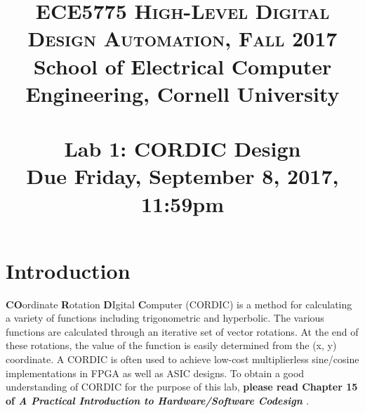 \documentclass[paper=letter, fontsize=11.6pt]{scrartcl} %
\title{	
\normalfont \normalsize 
\textsc{ECE5775 High-Level Digital Design Automation, Fall 2017} \\  
School of Electrical Computer Engineering, Cornell University \\ [11pt]%
\horrule{0.5pt} \\[0.4cm] %
\large Lab 1: CORDIC Design \\ %
\small Due Friday, September 8, 2017, 11:59pm
\horrule{0.5pt} \\[0.5cm] %
\vspace{-15ex}}
\date{}
\numberwithin{equation}{section} %
\numberwithin{figure}{section} %
\numberwithin{table}{section} %
\begin{document}
\maketitle %
\section{Introduction}

\textbf{CO}ordinate \textbf{R}otation \textbf{D}Igital \textbf{C}omputer (CORDIC) is a method for calculating a variety of functions including trigonometric and hyperbolic. The various functions are calculated through an iterative set of vector rotations. At the end of these rotations, the value of the function is easily determined from the (x, y) coordinate. A CORDIC is often used to achieve low-cost multiplierless sine/cosine implementations in FPGA as well as ASIC designs. To obtain a good understanding of CORDIC for the purpose of this lab, \textbf{please read Chapter 15 of \textit{A Practical Introduction to Hardware/Software Codesign} \cite{cordic}}.
\end{document}
